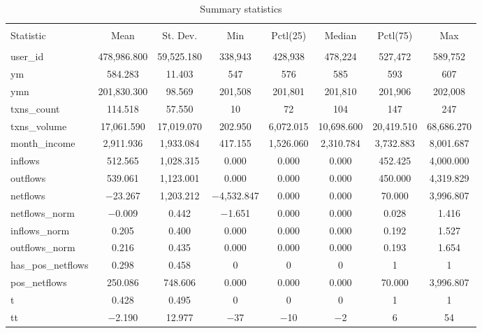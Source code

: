 
\begin{table}[!htbp] \centering 
  \caption{Summary statistics} 
  \label{tab:sumstats} 
\tiny 
\begin{tabular}{@{\extracolsep{5pt}}lccccccc} 
\\[-1.8ex]\hline 
\hline \\[-1.8ex] 
Statistic & \multicolumn{1}{c}{Mean} & \multicolumn{1}{c}{St. Dev.} & \multicolumn{1}{c}{Min} & \multicolumn{1}{c}{Pctl(25)} & \multicolumn{1}{c}{Median} & \multicolumn{1}{c}{Pctl(75)} & \multicolumn{1}{c}{Max} \\ 
\hline \\[-1.8ex] 
user\_id & 478,986.800 & 59,525.180 & 338,943 & 428,938 & 478,224 & 527,472 & 589,752 \\ 
ym & 584.283 & 11.403 & 547 & 576 & 585 & 593 & 607 \\ 
ymn & 201,830.300 & 98.569 & 201,508 & 201,801 & 201,810 & 201,906 & 202,008 \\ 
txns\_count & 114.518 & 57.550 & 10 & 72 & 104 & 147 & 247 \\ 
txns\_volume & 17,061.590 & 17,019.070 & 202.950 & 6,072.015 & 10,698.600 & 20,419.510 & 68,686.270 \\ 
month\_income & 2,911.936 & 1,933.084 & 417.155 & 1,526.060 & 2,310.784 & 3,732.883 & 8,001.687 \\ 
inflows & 512.565 & 1,028.315 & 0.000 & 0.000 & 0.000 & 452.425 & 4,000.000 \\ 
outflows & 539.061 & 1,123.001 & 0.000 & 0.000 & 0.000 & 450.000 & 4,319.829 \\ 
netflows & $-$23.267 & 1,203.212 & $-$4,532.847 & 0.000 & 0.000 & 70.000 & 3,996.807 \\ 
netflows\_norm & $-$0.009 & 0.442 & $-$1.651 & 0.000 & 0.000 & 0.028 & 1.416 \\ 
inflows\_norm & 0.205 & 0.400 & 0.000 & 0.000 & 0.000 & 0.192 & 1.527 \\ 
outflows\_norm & 0.216 & 0.435 & 0.000 & 0.000 & 0.000 & 0.193 & 1.654 \\ 
has\_pos\_netflows & 0.298 & 0.458 & 0 & 0 & 0 & 1 & 1 \\ 
pos\_netflows & 250.086 & 748.606 & 0.000 & 0.000 & 0.000 & 70.000 & 3,996.807 \\ 
t & 0.428 & 0.495 & 0 & 0 & 0 & 1 & 1 \\ 
tt & $-$2.190 & 12.977 & $-$37 & $-$10 & $-$2 & 6 & 54 \\ 

\end{tabular}
\end{table}
